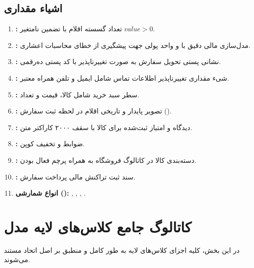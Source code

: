 \documentclass[11pt,a4paper]{article}
\begin{document}
\subsection{اشیاء مقداری }
\begin{enumerate}
    \item \textbf{:} تعداد گسسته اقلام با تضمین نامتغیر $value > 0$.
    \item \textbf{:} مدل‌سازی مالی دقیق با  و واحد پولی جهت پیشگیری از خطای محاسبات اعشاری.
    \item \textbf{:} نشانی پستی تحویل سفارش به صورت تغییرناپذیر با کد پستی ده‌رقمی.
    \item \textbf{:} شیء مقداری تغییرناپذیر اطلاعات تماس شامل ایمیل و تلفن همراه معتبر.
    \item \textbf{:} سطر سبد خرید شامل کالا، قیمت و تعداد.
    \item \textbf{:} تصویر پایدار و تاریخی اقلام در لحظه ثبت سفارش ().
    \item \textbf{:} دیدگاه و امتیاز ثبت‌شده برای کالا با سقف ۲۰۰۰ کاراکتر متن.
    \item \textbf{:} ضوابط و تخفیف کوپن.
    \item \textbf{:} دسته‌بندی کالا در کاتالوگ فروشگاه به همراه پرچم فعال بودن.
    \item \textbf{:} سند ثبت تراکنش مالی پرداخت سفارش.
    \item \textbf{انواع شمارشی ():} , , , .
\end{enumerate}

\newpage
\section{کاتالوگ جامع کلاس‌های لایه مدل }

در این بخش، کلیه اجزای کلاس‌های لایه  به طور کامل و منطبق بر اصل اتحاد مستند می‌شوند.

\end{document}

